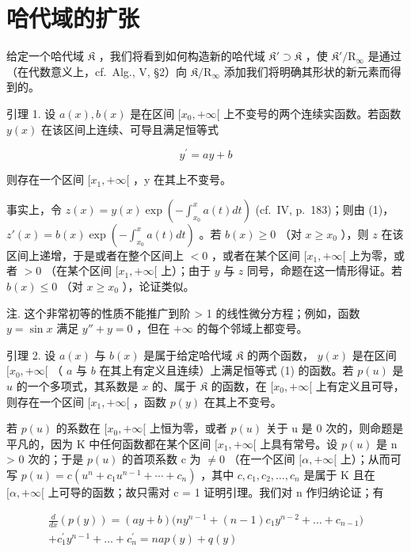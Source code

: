 \section{哈代域的扩张}

给定一个哈代域 \(\mathfrak{K}\) ，我们将看到如何构造新的哈代域 \(\mathfrak{K}' \supset \mathfrak{K}\) ，使 \(\mathfrak{K}' / \mathrm{R}_{\infty}\) 是通过（在代数意义上，cf.~Alg., V, §2）向 \(\mathfrak{K} / \mathrm{R}_{\infty}\) 添加我们将明确其形状的新元素而得到的。

引理 1. 设 \(a(x), b(x)\) 是在区间 \([x_0, +\infty[\) 上不变号的两个连续实函数。若函数 \(y(x)\) 在该区间上连续、可导且满足恒等式

\[
y ^ {\prime} = a y + b\tag{1}
\]

则存在一个区间 \([x_{1}, +\infty[\) ，y 在其上不变号。

事实上，令 \(z(x) = y(x) \exp \left(-\int_{x_0}^x a(t)dt\right)\) (cf.~IV, p.~183)；则由 (1)， \(z'(x) = b(x) \exp \left(-\int_{x_0}^x a(t)dt\right)\) 。若 \(b(x) \geqslant 0\) （对 \(x \geqslant x_0\) ），则 \(z\) 在该区间上递增，于是或者在整个区间上 \(< 0\) ，或者在某个区间 \([x_1, +\infty[\) 上为零，或者 \(> 0\) （在某个区间 \([x_1, +\infty[\) 上）；由于 \(y\) 与 \(z\) 同号，命题在这一情形得证。若 \(b(x) \leqslant 0\) （对 \(x \geqslant x_0\) ），论证类似。

注. 这个非常初等的性质不能推广到阶 \textgreater{} 1 的线性微分方程；例如，函数 \(y = \sin x\) 满足 \(y'' + y = 0\) ，但在 \(+\infty\) 的每个邻域上都变号。

引理 2. 设 \(a(x)\) 与 \(b(x)\) 是属于给定哈代域 \(\mathfrak{K}\) 的两个函数， \(y(x)\) 是在区间 \([x_0, +\infty[\) （ \(a\) 与 \(b\) 在其上有定义且连续）上满足恒等式 (1) 的函数。若 \(p(u)\) 是 \(u\) 的一个多项式，其系数是 \(x\) 的、属于 \(\mathfrak{K}\) 的函数，在 \([x_0, +\infty[\) 上有定义且可导，则存在一个区间 \([x_1, +\infty[\) ，函数 \(p(y)\) 在其上不变号。

若 \(p(u)\) 的系数在 \([x_{0}, +\infty[\) 上恒为零，或者 \(p(u)\) 关于 u 是 0 次的，则命题是平凡的，因为 K 中任何函数都在某个区间 \([x_{1}, +\infty[\) 上具有常号。设 \(p(u)\) 是 n \textgreater{} 0 次的；于是 \(p(u)\) 的首项系数 c 为 \(\neq 0\) （在一个区间 \([\alpha, +\infty[\) 上）；从而可写 \(p(u) = c(u^{n} + c_{1}u^{n-1} + \cdots + c_{n})\) ，其中 \(c, c_{1}, c_{2}, \ldots, c_{n}\) 是属于 K 且在 \([\alpha, +\infty[\) 上可导的函数；故只需对 c = 1 证明引理。我们对 n 作归纳论证；有

\[
\begin{array}{c} \frac {d}{d x} (p (y)) = (a y + b) \bigl (n y ^ {n - 1} + (n - 1) c _ {1} y ^ {n - 2} + \dots + c _ {n - 1} \bigr) \\ + c _ {1} ^ {\prime} y ^ {n - 1} + \dots + c _ {n} ^ {\prime} = n a p (y) + q (y) \end{array}
\]

